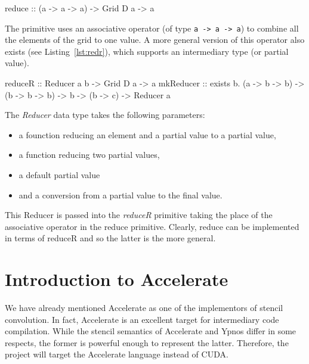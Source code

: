 \documentclass[12pt,a4paper,twoside]{scrbook}
\begin{document}
\begin{hflisting}[label={lst:red}, caption=The basic reduction primitive as
  defined in the original Ypnos paper.]
reduce :: (a -> a -> a) -> Grid D a -> a
\end{hflisting}

The primitive uses an associative operator (of type \texttt{a -\textgreater{} a
  -\textgreater{} a}) to combine all the elements of the grid to one value. A
more general version of this operator also exists (see Listing~\ref{lst:redr}),
which supports an intermediary type (or partial value).

\begin{hflisting}[label={lst:redr}, caption=The more general version of the
  reducer allowing for intermediary values.]
reduceR :: Reducer a b -> Grid D a -> a
mkReducer :: exists b. (a -> b -> b)
                    -> (b -> b -> b)
                    ->  b
                    -> (b -> c)
                    -> Reducer a
\end{hflisting}

The \emph{Reducer} data type takes the following parameters:

\begin{itemize}
\itemsep1pt\parskip0pt
\item
  a founction reducing an element and a partial value to a partial value,
\item
  a function reducing two partial values,
\item
  a default partial value
\item
  and a conversion from a partial value to the final value.
\end{itemize}

This Reducer is passed into the \emph{reduceR} primitive taking the place of the
associative operator in the reduce primitive. Clearly, reduce can be implemented
in terms of reduceR and so the latter is the more general.

\section{Introduction to Accelerate}

We have already mentioned Accelerate as one of the implementors of stencil
convolution. In fact, Accelerate is an excellent target for intermediary code
compilation. While the stencil semantics of Accelerate and Ypnos differ in some
respects, the former is powerful enough to represent the latter. Therefore, the
project will target the Accelerate language instead of CUDA.
\end{document}
